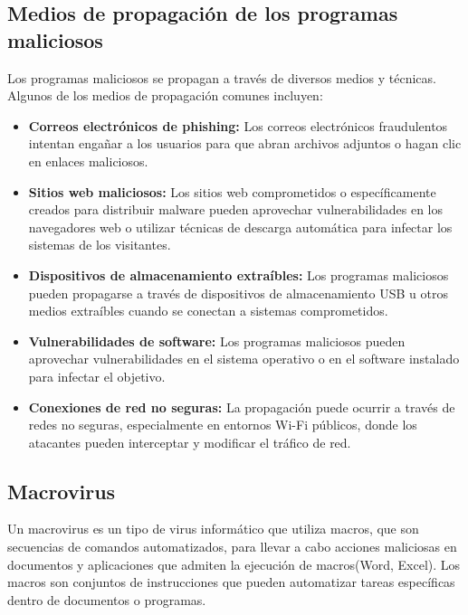 \subsection{Medios de propagación de los programas maliciosos}
Los programas maliciosos se propagan a través de diversos medios y técnicas. 
Algunos de los medios de propagación comunes incluyen:
\begin{tcolorbox}[title= Medios de propagación de los programas maliciosos]
	\begin{itemize}
		
		
		\item \textbf{Correos electrónicos de phishing:}
		Los correos electrónicos fraudulentos intentan engañar a los usuarios para que abran archivos adjuntos o hagan clic en enlaces maliciosos. 
		\item \textbf{Sitios web maliciosos:}
		 Los sitios web comprometidos o específicamente creados para distribuir malware pueden aprovechar vulnerabilidades en los navegadores web o utilizar técnicas de descarga automática para infectar los sistemas de los visitantes. 
		\item \textbf{Dispositivos de almacenamiento extraíbles:}
		 Los programas maliciosos pueden propagarse a través de dispositivos de almacenamiento USB u otros medios extraíbles cuando se conectan a sistemas comprometidos. 
		\item \textbf{Vulnerabilidades de software:}
		Los programas maliciosos pueden aprovechar vulnerabilidades en el sistema operativo o en el software instalado para infectar el objetivo. 
		\item \textbf{Conexiones de red no seguras:}
		La propagación puede ocurrir a través de redes no seguras, especialmente en entornos Wi-Fi públicos, donde los atacantes pueden interceptar y modificar el tráfico de red.
		
	\end{itemize}
\end{tcolorbox}
\subsection{Macrovirus}
Un macrovirus es un tipo de virus informático que utiliza macros, que son secuencias de comandos automatizados, para llevar a cabo acciones maliciosas en documentos y aplicaciones que admiten la ejecución de macros(Word, Excel). Los macros son conjuntos de instrucciones que pueden automatizar tareas específicas dentro de documentos o programas.
